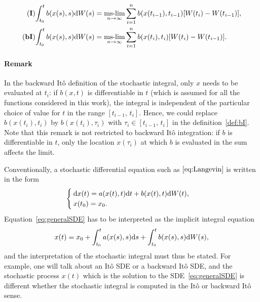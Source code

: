 \begin{subequations}
\begin{align}
        \I\int_{t_0}^t b(x(s),s) \rm dW(s) &= \mslim_{n\rightarrow \infty} \sum_{i=1}^n b(x(t_{i-1}),t_{i-1}) [W(t_i)-W(t_{i-1})], \label{def:I}\\
        \bI\int_{t_0}^t b(x(s),s) \rm dW(s) &= \mslim_{n\rightarrow \infty} \sum_{i=1}^n b(x(t_{i}),t_{i}) [W(t_i)-W(t_{i-1})]. \label{def:bI}
\end{align}
\end{subequations}
\paragraph{Remark}\label{remark:backwardIto} In the backward Itô definition of the stochastic integral, only $x$ needs to be evaluated at $t_i$: if $b(x,t)$ is differentiable in $t$ (which is assumed for all the functions considered in this work), the integral is independent of the particular choice of value for $t$ in the range $[t_{i-1},\, t_i]$. Hence, we could replace $b(x(t_i),t_i)$ by $b(x(t_i),\tau_i)$ with $\tau_i \in [t_{i-1},\, t_i]$ in the definition~\eqref{def:bI}. Note that this remark is not restricted to backward Itô integration: if $b$ is differentiable in $t$, only the location $x(\tau_i)$ at which $b$ is evaluated in the sum affects the limit.

Conventionally, a stochastic differential equation such as $\eqref{eq:Langevin}$ is written in the form
\begin{equation} \label{eq:generalSDE}
	\begin{cases}
		\rm dx(t) = a(x(t),t) \rm dt + b(x(t),t) \rm dW(t),\\
		x(t_0) = x_0. 
	\end{cases}
\end{equation}
Equation~\eqref{eq:generalSDE} has to be interpreted as the implicit integral equation
\begin{equation}
	x(t) = x_0 + \int_{t_0}^t a(x(s),s) \rm ds + \int_{t_0}^t b(x(s),s) \rm dW(s),
\end{equation}
and the interpretation of the stochastic integral must thus be stated. For example, one will talk about an Itô SDE or a backward Itô SDE, and the stochastic process $x(t)$ which is the solution to the SDE~\eqref{eq:generalSDE} is different whether the stochastic integral is computed in the Itô or backward Itô sense.

